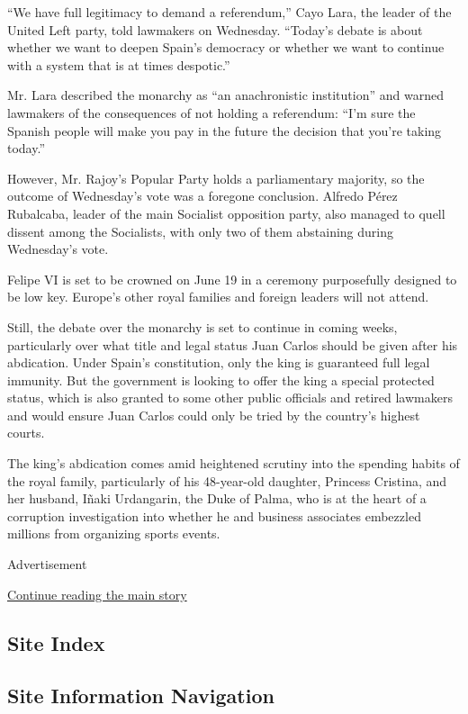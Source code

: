 ``We have full legitimacy to demand a referendum,'' Cayo Lara, the
leader of the United Left party, told lawmakers on Wednesday. ``Today's
debate is about whether we want to deepen Spain's democracy or whether
we want to continue with a system that is at times despotic.''

Mr. Lara described the monarchy as ``an anachronistic institution'' and
warned lawmakers of the consequences of not holding a referendum: ``I'm
sure the Spanish people will make you pay in the future the decision
that you're taking today.''

However, Mr. Rajoy's Popular Party holds a parliamentary majority, so
the outcome of Wednesday's vote was a foregone conclusion. Alfredo Pérez
Rubalcaba, leader of the main Socialist opposition party, also managed
to quell dissent among the Socialists, with only two of them abstaining
during Wednesday's vote.

Felipe VI is set to be crowned on June 19 in a ceremony purposefully
designed to be low key. Europe's other royal families and foreign
leaders will not attend.

Still, the debate over the monarchy is set to continue in coming weeks,
particularly over what title and legal status Juan Carlos should be
given after his abdication. Under Spain's constitution, only the king is
guaranteed full legal immunity. But the government is looking to offer
the king a special protected status, which is also granted to some other
public officials and retired lawmakers and would ensure Juan Carlos
could only be tried by the country's highest courts.

The king's abdication comes amid heightened scrutiny into the spending
habits of the royal family, particularly of his 48-year-old daughter,
Princess Cristina, and her husband, Iñaki Urdangarin, the Duke of Palma,
who is at the heart of a corruption investigation into whether he and
business associates embezzled millions from organizing sports events.

Advertisement

\protect\hyperlink{after-bottom}{Continue reading the main story}

\hypertarget{site-index}{%
\subsection{Site Index}\label{site-index}}

\hypertarget{site-information-navigation}{%
\subsection{Site Information
Navigation}\label{site-information-navigation}}

